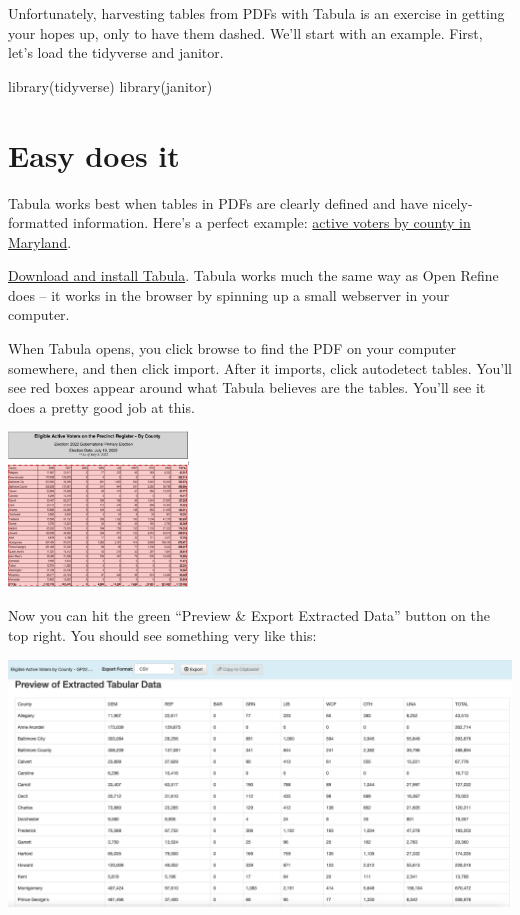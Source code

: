 \documentclass[
  letterpaper,
  DIV=11,
  numbers=noendperiod]{scrreprt}
\newenvironment{Shaded}{\begin{snugshade}}{\end{snugshade}}
\newcommand{\FunctionTok}[1]{\textcolor[rgb]{0.28,0.35,0.67}{#1}}
\newcommand{\NormalTok}[1]{\textcolor[rgb]{0.00,0.23,0.31}{#1}}
\begin{document}
Unfortunately, harvesting tables from PDFs with Tabula is an exercise in
getting your hopes up, only to have them dashed. We'll start with an
example. First, let's load the tidyverse and janitor.

\begin{Shaded}
\begin{Highlighting}[]
\FunctionTok{library}\NormalTok{(tidyverse)}
\FunctionTok{library}\NormalTok{(janitor)}
\end{Highlighting}
\end{Shaded}

\hypertarget{easy-does-it}{%
\section{Easy does it}\label{easy-does-it}}

Tabula works best when tables in PDFs are clearly defined and have
nicely-formatted information. Here's a perfect example:
\href{https://www.elections.maryland.gov/press_room/2022_stats/GG22/Eligible\%20Active\%20Voters\%20by\%20County\%20-\%20GG22.pdf}{active
voters by county in Maryland}.

\href{https://tabula.technology/}{Download and install Tabula}. Tabula
works much the same way as Open Refine does -- it works in the browser
by spinning up a small webserver in your computer.

When Tabula opens, you click browse to find the PDF on your computer
somewhere, and then click import. After it imports, click autodetect
tables. You'll see red boxes appear around what Tabula believes are the
tables. You'll see it does a pretty good job at this.

\includegraphics[width=1.89in,height=\textheight]{./images/md_voters.png}

Now you can hit the green ``Preview \& Export Extracted Data'' button on
the top right. You should see something very like this:

\includegraphics[width=5.4in,height=\textheight]{./images/md_voters2.png}
\end{document}
